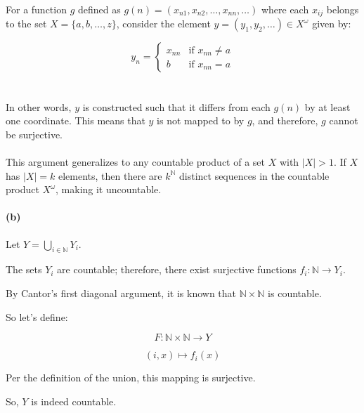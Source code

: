 \documentclass[12pt]{article}
\begin{document}
For a function \(g\) defined as \(g(n) = (x_{n1}, x_{n2}, \ldots, x_{nn}, \ldots)\) where each \(x_{ij}\) belongs to the set \(X = \{a, b, \ldots, z\}\), consider the element \(y = (y_1, y_2, \ldots) \in X^\omega\) given by:

\[
y_n = 
\begin{cases}
    x_{nn} & \text{if } x_{nn} \neq a \\
    b & \text{if } x_{nn} = a
\end{cases}
\]
\\ \\
In other words, \(y\) is constructed such that it differs from each \(g(n)\) by at least one coordinate. This means that \(y\) is not mapped to by \(g\), and therefore, \(g\) cannot be surjective.
\\ \\
This argument generalizes to any countable product of a set \(X\) with \(\lvert X \rvert > 1\). If \(X\) has \(\lvert X \rvert = k\) elements, then there are \(k^{\mathbb{N}}\) distinct sequences in the countable product \(X^\omega\), making it uncountable.



\paragraph{(b)}
Let \(Y = \bigcup_{i \in \mathbb{N}} Y_i\).

The sets \(Y_i\) are countable; therefore, there exist surjective functions \(f_i: \mathbb{N} \rightarrow Y_i\).

By Cantor's first diagonal argument, it is known that \(\mathbb{N} \times \mathbb{N}\) is countable.

So let's define:

\[ F: \mathbb{N} \times \mathbb{N} \rightarrow Y \]

\[ (i, x) \mapsto f_i(x) \]

Per the definition of the union, this mapping is surjective.

So, \(Y\) is indeed countable.
\end{document}
